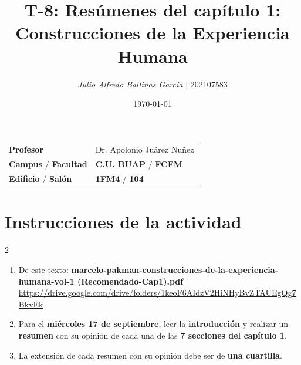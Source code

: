 \documentclass{article}
\title{ \textcolor{Tarawera}{\textbf{T-\textcolor{Sun}{\textbf{8}}}}: \textcolor{Cinnabar}{\textbf{Resúmenes del capítulo 1: \textcolor{orange(colorwheel)}{\textbf{Construcciones de la Experiencia Humana}}}}}
\author{\emph{Julio Alfredo Ballinas García} $\boldsymbol{\mid}$ 202107583}
\date{\today}
\begin{document}
\maketitle



\begin{mybox}
	\noindent\begin{tabular}{@{}ll}
		{\bfseries{Profesor}} & Dr. Apolonio Juárez Nuñez\\
		\textcolor{prussianblue}{\bfseries{Campus}} / \textcolor{trueblue}{\bfseries{Facultad}}  & \textcolor{prussianblue}{\bfseries{C.U. BUAP}} /  \textcolor{trueblue}{\bfseries{FCFM}} \\
		\textcolor{prussianblue}{\bfseries{Edificio}} /  \textcolor{trueblue}{\bfseries{Salón}}    & 	\textcolor{prussianblue}{\bfseries{1FM4}} /  \textcolor{trueblue}{\bfseries{104}}   
	\end{tabular} 
\end{mybox} \vspace{1cm}

\section*{Instrucciones de la actividad}

\setlength{\columnsep}{2cm}
\begin{multicols}{2} %
	\begin{enumerate}[label={{\textcolor{trueblue}{\textbf{Ej}. \arabic*.0}}}, start=1]
		\item De este texto: \textbf{marcelo-pakman-construcciones-de-la-experiencia-humana-vol-1 (Recomendado-Cap1).pdf} \\
		\url{https://drive.google.com/drive/folders/1keoF6AIdzV2HiNHyBvZTAUEgQg7BkvEk}
		
		\item Para el \textbf{miércoles 17 de septiembre}, leer la \textbf{introducción} y realizar un \textbf{resumen} con su opinión de cada una de las \textbf{7 secciones del capítulo 1}.
		
		\item La extensión de cada resumen con su opinión debe ser de \textbf{una cuartilla}.
	\end{enumerate}
\end{multicols}

\vspace{2cm}
\end{document}
